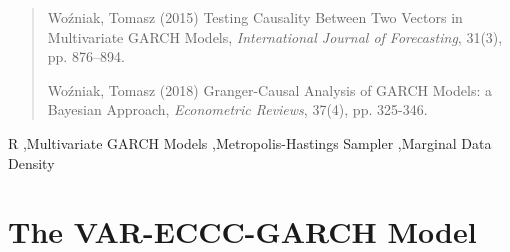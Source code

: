 \documentclass[final,3p,authoryear]{elsarticle}
\begin{document}
\begin{frontmatter}
\begin{abstract}
\bigskip\noindent Wo\'zniak, Tomasz (2015) Testing Causality Between Two Vectors in Multivariate GARCH Models, \emph{International Journal of Forecasting}, 31(3), pp. 876--894.

\bigskip\noindent Wo\'zniak, Tomasz (2018) Granger-Causal Analysis of GARCH Models: a Bayesian Approach, \emph{Econometric Reviews}, 37(4), pp. 325-346.

\end{abstract}

\begin{keyword}
R \sep Multivariate GARCH Models \sep Metropolis-Hastings Sampler \sep Marginal Data Density
\end{keyword}

\end{frontmatter}
 
 
 
 
 
 
 
 
 
 
 
\section{The VAR-ECCC-GARCH Model} 
\end{document}
